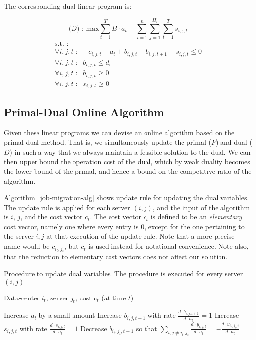 The corresponding dual linear program is:

\[
\textrm{($D$) : max}   \sum^{T}_{t=1}B \cdot a_t - \sum^{n}_{i=1}\sum^{H_i}_{j=1}\sum^{T}_{t=1}s_{i,j,t}
\]
\[
	\begin{array}{rc}
	\textrm{s.t. :} & \\
		\forall i,j,t \textrm{ :}	    & -c_{i,j,t} + a_t + b_{i,j,t} - b_{i,j,t+1} - s_{i,j,t} \leq 0 \\
		\forall i,j,t \textrm{ :}	    & b_{i,j,t} \leq d_i \\
		\forall i,j,t \textrm{ :}	    & b_{i,j,t} \geq 0 \\
		\forall i,j,t \textrm{ :}	    & s_{i,j,t} \geq 0
	\end{array}
\]

\subsection{Primal-Dual Online Algorithm}
\label{pd-alg}

Given these  linear programs we can devise an online algorithm based on the primal-dual method.
That is, we simultaneously update the primal ($P$) and dual ($D$) in such a way that we always maintain a feasible solution to the dual.
We can then upper bound the operation cost of the dual, which by weak duality becomes the lower bound of the primal, and hence a bound on the competitive ratio of the algorithm.

Algorithm~\ref{job-migration-alg} shows update rule for updating the dual variables.
The update rule is applied for each server $(i,j)$, and the input of the algorithm is $i$, $j$, and the cost vector $c_t$. 
The cost vector $c_t$ is defined to be an \emph{elementary} cost vector, namely one where every entry is $0$, except for the one pertaining to the server $i,j$ at that execution of the update rule.
Note that a more precise name would be $c_{i_t,j_t}$, but $c_t$ is used instead for notational convenience.
Note also, that the reduction to elementary cost vectors does not affect our solution.

\begin{algorithm}
\caption{Procedure to update dual variables. The procedure is executed for every server $(i,j)$}
\label{job-migration-alg}
\begin{algorithmic}[1]
\REQUIRE Data-center $i_t$, server $j_t$, cost $c_t$ (at time $t$)

 \STATE Increase $a_t$ by a small amount
  \STATE Increase $b_{i,j,t+1}$ with rate $\frac{d \cdot b_{i,j,t+1}}{d \cdot a_t} = 1$
 \ENDFOR
  \STATE Increase $s_{i,j,t}$ with rate $\frac{d \cdot s_{i,j,t}}{d \cdot a_t}=1$
 \ENDFOR
  \STATE Decrease $b_{i_t,j_t,t+1}$ so that $\sum_{i,j \neq i_t,j_t}\frac{d \cdot y_{i,j,t}}{d \cdot a_t} = -\frac{d \cdot y_{i_t,j_t,t}}{d \cdot a_t}$
 \ENDFOR
\ENDWHILE
\end{algorithmic}
\end{algorithm}

